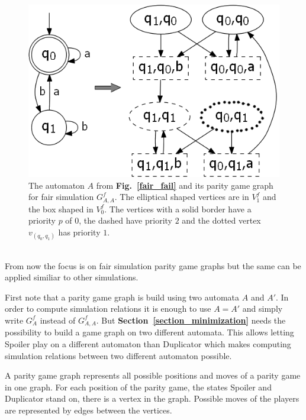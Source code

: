 \documentclass[12pt,oneside,bibliography=totoc,abstracton]{scrartcl}
\newcommand{\figref}[1]{\textbf{Fig.~\ref{#1}}}
\newcommand{\sectionref}[1]{\textbf{Section~\ref{#1}}}
\begin{document}
\begin{figure}[ht]
	 \begin{center}
		\includegraphics[scale=0.7]{res/paritygamegraph}
	\end{center}
	\caption{The automaton $A$ from \figref{fair_fail} and its parity game graph for fair simulation $G^f_{A, A}$.
		The elliptical shaped vertices are in $V_1^f$ and the box shaped in $V_0^f$. The vertices with a solid
		border have a priority $p$ of $0$, the dashed have priority $2$ and the dotted
		vertex $v_{(q_0, q_1)}$ has priority $1$.}
	\label{paritygamegraph}
\end{figure}\quad\\
From now the focus is on fair simulation parity game graphs but the same can be applied similiar to other simulations.

First note that a parity game graph is build using two automata $A$ and $A'$. In order to compute simulation
relations it is enough to use $A = A'$ and simply write $G^f_A$ instead of $G^f_{A, A}$.
But \sectionref{section_minimization} needs the possibility to build a game graph on two different automata.
This allows letting Spoiler play on a different automaton than Duplicator which makes computing simulation
relations between two different automaton possible.

A parity game graph represents all possible positions and moves of a parity game in one graph.
For each position of the parity game, the states Spoiler and Duplicator stand on,
there is a vertex in the graph. Possible moves of the players are represented by edges
between the vertices.
\end{document}
